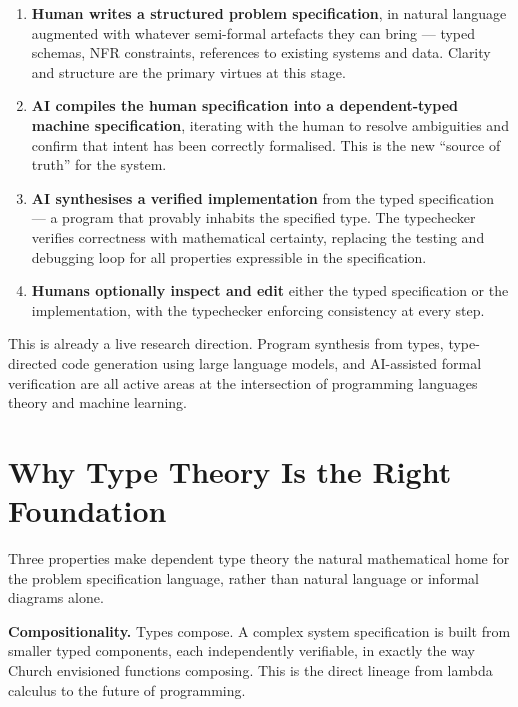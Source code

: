\documentclass[12pt]{article}
\begin{document}
\begin{enumerate}
  \item \textbf{Human writes a structured problem specification}, in natural
        language augmented with whatever semi-formal artefacts they can
        bring --- typed schemas, NFR constraints, references to existing
        systems and data. Clarity and structure are the primary virtues at
        this stage.

  \item \textbf{AI compiles the human specification into a dependent-typed
        machine specification}, iterating with the human to resolve
        ambiguities and confirm that intent has been correctly formalised.
        This is the new ``source of truth'' for the system.

  \item \textbf{AI synthesises a verified implementation} from the typed
        specification --- a program that provably inhabits the specified
        type. The typechecker verifies correctness with mathematical
        certainty, replacing the testing and debugging loop for all
        properties expressible in the specification.

  \item \textbf{Humans optionally inspect and edit} either the typed
        specification or the implementation, with the typechecker enforcing
        consistency at every step.
\end{enumerate}

This is already a live research direction. Program synthesis from types,
type-directed code generation using large language models, and AI-assisted
formal verification are all active areas at the intersection of programming
languages theory and machine learning.

\section{Why Type Theory Is the Right Foundation}

Three properties make dependent type theory the natural mathematical home for
the problem specification language, rather than natural language or informal
diagrams alone.

\textbf{Compositionality.} Types compose. A complex system specification is
built from smaller typed components, each independently verifiable, in exactly
the way Church envisioned functions composing. This is the direct lineage from
lambda calculus to the future of programming.
\end{document}
